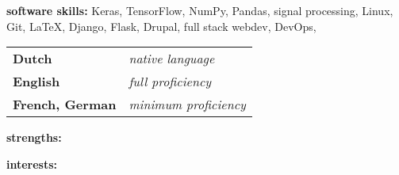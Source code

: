 







\divider

\textbf{software skills:}
Keras,
TensorFlow,
NumPy,
Pandas,
signal processing,
Linux,
Git,
\LaTeX,
Django,
Flask,
Drupal,
full stack webdev,
DevOps,


\divider

\begin{tabular}{p{2.5cm} p{4cm}}
    \textbf{Dutch}          & \textit{native language}                           \\
    \textbf{English}        & \textit{full proficiency}             \\
    \textbf{French, German} & \textit{minimum proficiency}
\end{tabular}


\textbf{strengths:} \smallskip  \newline
{}

\divider

\textbf{interests:} \smallskip \newline
{}


